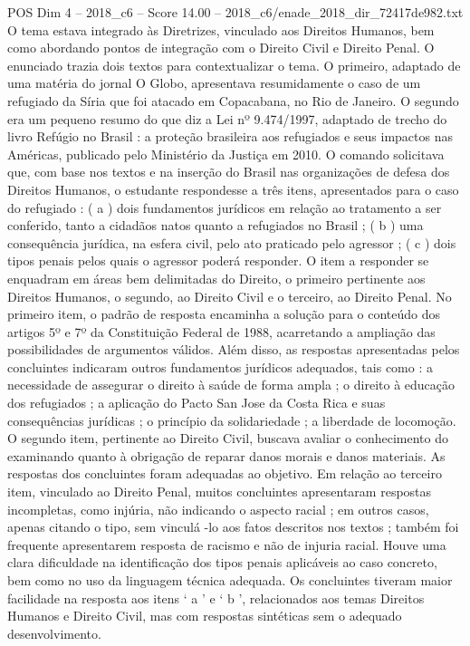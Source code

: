 \begin{textsample}{POS Dim 4 – 2018\_c6 – Score 14.00 – 2018\_c6/enade\_2018\_dir\_72417de982.txt}
O tema estava integrado às Diretrizes, vinculado aos Direitos Humanos, bem como abordando pontos de integração com o Direito Civil e Direito Penal.
O enunciado trazia dois textos para contextualizar o tema.
O primeiro, adaptado de uma matéria do jornal O Globo, apresentava resumidamente o caso de um refugiado da Síria que foi atacado em Copacabana, no Rio de Janeiro.
O segundo era um pequeno resumo do que diz a Lei nº 9.474/1997, adaptado de trecho do livro Refúgio no Brasil : a proteção brasileira aos refugiados e seus impactos nas Américas, publicado pelo Ministério da Justiça em 2010.
O comando solicitava que, com base nos textos e na inserção do Brasil nas organizações de defesa dos Direitos Humanos, o estudante respondesse a três itens, apresentados para o caso do refugiado : ( a ) dois fundamentos jurídicos em relação ao tratamento a ser conferido, tanto a cidadãos natos quanto a refugiados no Brasil ; ( b ) uma consequência jurídica, na esfera civil, pelo ato praticado pelo agressor ; ( c ) dois tipos penais pelos quais o agressor poderá responder.
O item a responder se enquadram em áreas bem delimitadas do Direito, o primeiro pertinente aos Direitos Humanos, o segundo, ao Direito Civil e o terceiro, ao Direito Penal.
No primeiro item, o padrão de resposta encaminha a solução para o conteúdo dos artigos 5º e 7º da Constituição Federal de 1988, acarretando a ampliação das possibilidades de argumentos válidos.
Além disso, as respostas apresentadas pelos concluintes indicaram outros fundamentos jurídicos adequados, tais como : a necessidade de assegurar o direito à saúde de forma ampla ; o direito à educação dos refugiados ; a aplicação do Pacto San Jose da Costa Rica e suas consequências jurídicas ; o princípio da solidariedade ; a liberdade de locomoção.
O segundo item, pertinente ao Direito Civil, buscava avaliar o conhecimento do examinando quanto à obrigação de reparar danos morais e danos materiais.
As respostas dos concluintes foram adequadas ao objetivo.
Em relação ao terceiro item, vinculado ao Direito Penal, muitos concluintes apresentaram respostas incompletas, como injúria, não indicando o aspecto racial ; em outros casos, apenas citando o tipo, sem vinculá -lo aos fatos descritos nos textos ; também foi frequente apresentarem resposta de racismo e não de injuria racial.
Houve uma clara dificuldade na identificação dos tipos penais aplicáveis ao caso concreto, bem como no uso da linguagem técnica adequada.
Os concluintes tiveram maior facilidade na resposta aos itens ‘ a ’ e ‘ b ’, relacionados aos temas Direitos Humanos e Direito Civil, mas com respostas sintéticas sem o adequado desenvolvimento.

\end{textsample}
